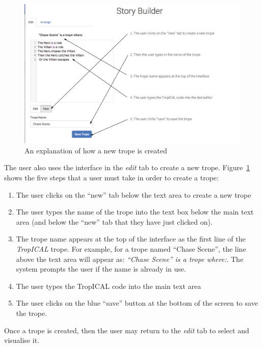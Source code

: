 \documentclass[11pt]{report}
\begin{document}
\begin{figure}[!ht]
\centerline{\includegraphics[width=\textwidth]{storybuilder-new1.png}}
\caption{An explanation of how a new trope is created}\label{fig:sb-new-ann}
\end{figure}

The user also uses the interface in the \emph{edit} tab to create a new trope.
Figure~\ref{fig:sb-new-ann} shows the five steps that a user must take in order
to create a trope:

\begin{enumerate}
  \item The user clicks on the ``new'' tab below the text area to create a new trope
  \item The user types the name of the trope into the text box below the main
    text area (and below the ``new'' tab that they have just clicked on).
  \item The trope name appears at the top of the interface as the first line of
    the \emph{TropICAL} trope. For example, for a trope named ``Chase Scene'',
    the line above the text area will appear as: \emph{``Chase Scene'' is a
      trope where:}. The system prompts the user if the name is already in use.
  \item The user types the TropICAL code into the main text area
  \item The user clicks on the blue ``save'' button at the bottom of the screen
    to save the trope.
\end{enumerate}

Once a trope is created, then the user may return to the \emph{edit} tab to
select and visualise it.
\end{document}

